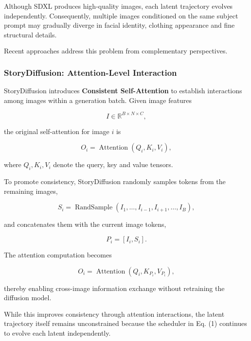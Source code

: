 \documentclass[12pt]{article}
\DeclareMathOperator{\Attention}{Attention}
\DeclareMathOperator{\RandSample}{RandSample}
\begin{document}
Although SDXL produces high-quality images, each latent trajectory evolves independently. Consequently, multiple images conditioned on the same subject prompt may gradually diverge in facial identity, clothing appearance and fine structural details.

Recent approaches address this problem from complementary perspectives.

\subsubsection{StoryDiffusion: Attention-Level Interaction}

StoryDiffusion introduces \textbf{Consistent Self-Attention} to establish interactions among images within a generation batch. Given image features

\begin{equation}
I \in \mathbb{R}^{B \times N \times C},
\end{equation}

the original self-attention for image $i$ is

\begin{equation}
O_i = \Attention(Q_i, K_i, V_i),
\tag{3}
\end{equation}

where $Q_i, K_i, V_i$ denote the query, key and value tensors.

To promote consistency, StoryDiffusion randomly samples tokens from the remaining images,

\begin{equation}
S_i = \RandSample(I_1, \ldots, I_{i-1}, I_{i+1}, \ldots, I_B),
\tag{4}
\end{equation}

and concatenates them with the current image tokens,

\begin{equation}
P_i = [I_i, S_i].
\end{equation}

The attention computation becomes

\begin{equation}
O_i = \Attention(Q_i, K_{P_i}, V_{P_i}),
\tag{5}
\end{equation}

thereby enabling cross-image information exchange without retraining the diffusion model.

While this improves consistency through attention interactions, the latent trajectory itself remains unconstrained because the scheduler in Eq. (1) continues to evolve each latent independently.
\end{document}
